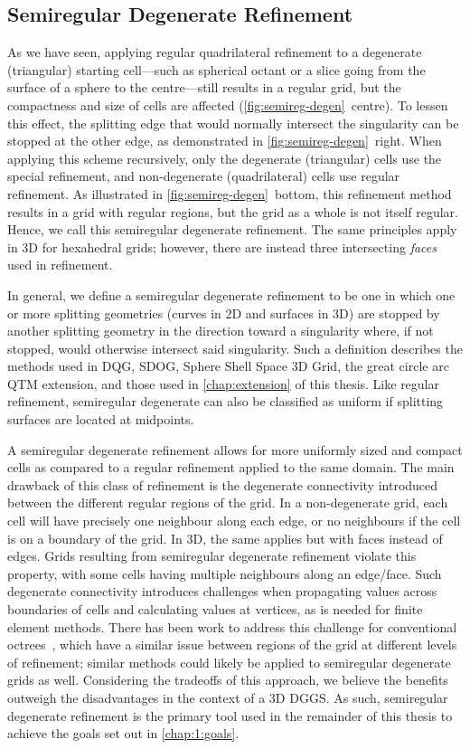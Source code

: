 \subsection{Semiregular Degenerate Refinement} \label{chap:3:semiregDegen}
As we have seen, applying regular quadrilateral refinement to a degenerate (triangular) starting cell---such as spherical octant or a slice going from the surface of a sphere to the centre---still results in a regular grid, but the compactness and size of cells are affected (\cref{fig:semireg-degen}~centre).
To lessen this effect, the splitting edge that would normally intersect the singularity can be stopped at the other edge, as demonstrated in \cref{fig:semireg-degen}~right.
When applying this scheme recursively, only the degenerate (triangular) cells use the special refinement, and non-degenerate (quadrilateral) cells use regular refinement.
As illustrated in \cref{fig:semireg-degen}~bottom, this refinement method results in a grid with regular regions, but the grid as a whole is not itself regular.
Hence, we call this semiregular degenerate refinement.
The same principles apply in 3D for hexahedral grids; however, there are instead three intersecting \textit{faces} used in refinement.


In general, we define a semiregular degenerate refinement to be one in which one or more splitting geometries (curves in 2D and surfaces in 3D) are stopped by another splitting geometry in the direction toward a singularity where, if not stopped, would otherwise intersect said singularity.
Such a definition describes the methods used in DQG, SDOG, Sphere Shell Space 3D Grid, the great circle arc QTM extension, and those used in \cref{chap:extension} of this thesis.
Like regular refinement, semiregular degenerate can also be classified as uniform if splitting surfaces are located at midpoints.


A semiregular degenerate refinement allows for more uniformly sized and compact cells as compared to a regular refinement applied to the same domain.
The main drawback of this class of refinement is the degenerate connectivity introduced between the different regular regions of the grid.
In a non-degenerate grid, each cell will have precisely one neighbour along each edge, or no neighbours if the cell is on a boundary of the grid.
In 3D, the same applies but with faces instead of edges.
Grids resulting from semiregular degenerate refinement violate this property, with some cells having multiple neighbours along an edge/face.
Such degenerate connectivity introduces challenges when propagating values across boundaries of cells and calculating values at vertices, as is needed for finite element methods.
There has been work to address this challenge for conventional octrees~\cite{braun2008douar}, which have a similar issue between regions of the grid at different levels of refinement; similar methods could likely be applied to semiregular degenerate grids as well.
Considering the tradeoffs of this approach, we believe the benefits outweigh the disadvantages in the context of a 3D DGGS.
As such, semiregular degenerate refinement is the primary tool used in the remainder of this thesis to achieve the goals set out in \cref{chap:1:goals}.
